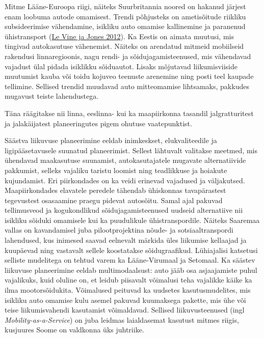 \documentclass[estonian,]{article}
\begin{document}
Mitme Lääne-Euroopa riigi, näiteks Suurbritannia noored on hakanud järjest enam loobuma autode omamisest. Trendi põhjusteks on ametisõitude riikliku subsideerimise vähendamine, isikliku auto omamise kallinemine ja paranenud ühistransport (\protect\hyperlink{Le-Vine2012}{Le Vine ja Jones 2012}). Ka Eestis on aimata muutusi, mis tingivad autokasutuse vähenemist. Näiteks on arendatud mitmeid mobiilseid rakendusi linnaregioonis, nagu rendi- ja sõidujagamisteenused, mis vähendavad vajadust ülal pidada isiklikku sõiduautot. Lisaks mõjutavad liikumisviiside muutumist kauba või toidu kojuveo teenuste arenemine ning posti teel kaupade tellimine. Sellised trendid muudavad auto mitteomamise lihtsamaks, pakkudes mugavust teiste lahendustega.

\begin{blockquote-right}
Täna räägitakse nii linna, eeslinna- kui ka maapiirkonna tasandil
jalgratturitest ja jalakäijatest planeeringutes pigem ohutuse
vaatepunktist.
\end{blockquote-right}

Säästva liikuvuse planeerimine eeldab inimkeskset, elukvaliteedile ja ligipääsetavusele suunatud planeerimist. Sellest lähtuvalt valitakse meetmed, mis ühendavad maakasutuse suunamist, autokasutajatele mugavate alternatiivide pakkumist, selleks vajaliku taristu loomist ning teadlikkuse ja hoiakute kujundamist. Eri piirkondades on ka veidi erinevad vajadused ja väljakutsed. Maapiirkondades elavatele peredele tähendab ühiskonnas tavapärastest tegevustest osasaamine praegu pidevat autosõitu. Samal ajal pakuvad tellimusveod ja kogukondlikud sõidujagamisteenused uudseid alternatiive nii isikliku sõiduki omamisele kui ka puudulikule ühistranspordile. Näiteks Saaremaa vallas on kavandamisel juba pilootprojektina nõude- ja sotsiaaltranspordi lahendused, kus inimesed saavad eelnevalt märkida üles liikumise kellaajad ja kuupäevad ning vastavalt sellele koostatakse sõidugraafikud. Lühiajalisi katsetusi selliste mudelitega on tehtud varem ka Lääne-Virumaal ja Setomaal. Ka säästev liikuvuse planeerimine eeldab multimodaalsust: auto jääb osa asjaajamiste puhul vajalikuks, kuid oluline on, et leidub piisavalt võimalusi teha vajalikke käike ka ilma mootorsõidukita. Võimalused peituvad ka uudsetes kasutusmudelites, mis isikliku auto omamise kulu asemel pakuvad kuumaksega pakette, mis ühe või teise liikumisvahendi kasutamist võimaldavad. Sellised liikuvusteenused (ingl \emph{Mobility-as-a-Service}) on juba leidmas laialdasemat kasutust mitmes riigis, kusjuures Soome on valdkonna üks juhtriike.
\end{document}
